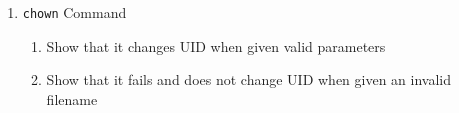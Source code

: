 \documentclass[11pt,letterpaper]{report}
\begin{document}
\begin{enumerate}
                                                                                                                                                                                                                                                                                                                                                                                                                                                                                                                                                                                                                                                        \item {\tt chown} Command
                                                                                                                                                                                                                                                                                                                                                                                                                                                                                                                                                                                                                                                            \begin{enumerate}
                                                                                                                                                                                                                                                                                                                                                                                                                                                                                                                                                                                                                                                                    \item  Show that it changes UID when given valid parameters
                                                                                                                                                                                                                                                                                                                                                                                                                                                                                                                                                                                                                                                                            \item Show that it fails and does not change UID when given an invalid filename

\end{enumerate}
\end{enumerate}
\end{document}
